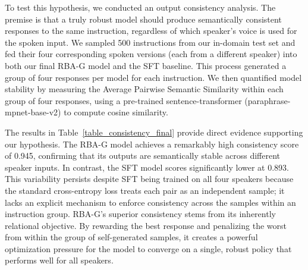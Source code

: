 \documentclass[letterpaper]{article} %
\begin{document}
To test this hypothesis, we conducted an output consistency analysis. The premise is that a truly robust model should produce semantically consistent responses to the same instruction, regardless of which speaker's voice is used for the spoken input. We sampled 500 instructions from our in-domain test set and fed their four corresponding spoken versions (each from a different speaker) into both our final RBA-G model and the SFT baseline. This process generated a group of four responses per model for each instruction. We then quantified model stability by measuring the Average Pairwise Semantic Similarity within each group of four responses, using a pre-trained sentence-transformer (paraphrase-mpnet-base-v2) to compute cosine similarity.  \par
\begin{table}[h]
\centering
{}
\caption{Cross-speaker output consistency results. The score measures the average semantic similarity of a model's responses to the same instruction spoken by four different speakers. A higher score indicates greater robustness to acoustic variations.}
\label{table_consistency_final}
\end{table}
The results in Table~\ref{table_consistency_final} provide direct evidence supporting our hypothesis. The RBA-G model achieves a remarkably high consistency score of 0.945, confirming that its outputs are semantically stable across different speaker inputs. In contrast, the SFT model scores significantly lower at 0.893. This variability persists despite SFT being trained on all four speakers because the standard cross-entropy loss treats each pair as an independent sample; it lacks an explicit mechanism to enforce consistency across the samples within an instruction group. RBA-G's superior consistency stems from its inherently relational objective. By rewarding the best response and penalizing the worst from within the group of self-generated samples, it creates a powerful optimization pressure for the model to converge on a single, robust policy that performs well for all speakers.
\end{document}

